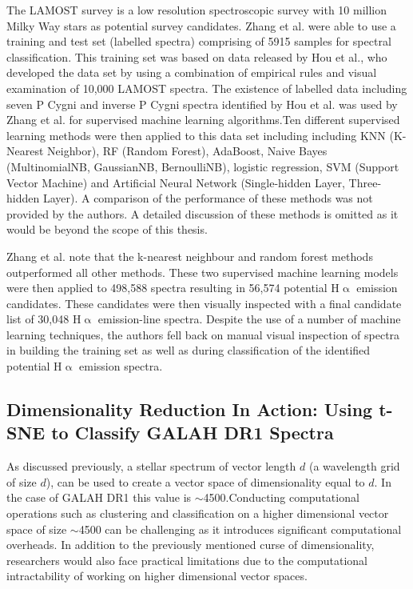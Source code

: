 The LAMOST survey is a low resolution spectroscopic survey with 10 million Milky Way stars as potential survey candidates. Zhang et al. were able to use a training and test set (labelled spectra) comprising of 5915 samples for spectral classification. This training set was based on data released by Hou et al.\cite{hou2016catalog}, who developed the data set by using a combination of empirical rules and visual examination of 10,000 LAMOST spectra. The existence of labelled data including seven P Cygni and inverse P Cygni spectra identified by Hou et al. was used by Zhang et al. for supervised machine learning algorithms.Ten different supervised learning methods were then applied to this data set including including KNN (K-Nearest Neighbor), RF (Random Forest), AdaBoost, Naive Bayes (MultinomialNB, GaussianNB, BernoulliNB), logistic regression, SVM (Support Vector Machine) and Artificial Neural Network (Single-hidden Layer, Three-hidden Layer)\cite{zhang2021catalog}. A comparison of the performance of these methods was not provided by the authors. A detailed discussion of these methods is omitted as it would be beyond the scope of this thesis. 

Zhang et al. note that the k-nearest neighbour and random forest methods outperformed all other methods. These two supervised machine learning models were then applied to 498,588 spectra resulting in 56,574 potential H$\upalpha$ emission candidates. These candidates were then visually inspected with a final candidate list of 30,048 H$\upalpha$ emission-line spectra. Despite the use of a number of machine learning techniques, the authors fell back on manual visual inspection of spectra in building the training set as well as during classification of the identified potential H$\upalpha$ emission spectra.

\subsection{Dimensionality Reduction In Action: Using t-SNE to Classify GALAH DR1 Spectra}

As discussed previously, a stellar spectrum of vector length $d$ (a wavelength grid of size $d$), can be used to create a vector space of dimensionality equal to $d$. In the case of GALAH DR1 this value is $\sim$4500.Conducting computational operations such as clustering and classification on a higher dimensional vector space of size $\sim$4500 can be challenging as it introduces significant computational overheads. In addition to the previously mentioned curse of dimensionality, researchers would also face practical limitations due to the computational intractability of working on higher dimensional vector spaces.

